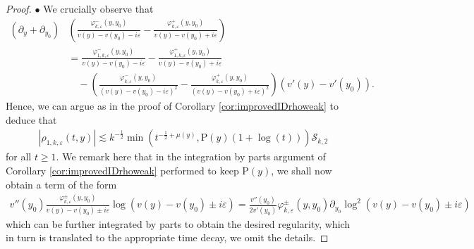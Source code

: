 \documentclass[11pt,reqno]{amsproc}
\newcommand{\bullpar}[1]{\vspace{.5em}\noindent $\bullet$ \normalfont {\bfseries #1.}}
\theoremstyle{definition}
\numberwithin{equation}{section}
\newcommand{\cS}{{\mathcal S}}
\newcommand{\ep}{\varepsilon}
\begin{document}
\begin{proof}
\bullpar{Estimates for $\rho_{1,k,\ep}(t,y)$} We crucially observe that
\begin{align*}
\left( \partial_y + \partial_{y_0} \right) &\left( \frac{\varphi_{k,\ep}^-(y,y_0)}{v(y) - v(y_0) - i\ep} - \frac{\varphi_{k,\ep}^+(y,y_0)}{v(y) - v(y_0) + i\ep} \right) \\
&= \frac{\varphi_{1,k,\ep}^-(y,y_0)}{v(y) - v(y_0) - i\ep} - \frac{\varphi_{1,k,\ep}^+(y,y_0)}{v(y) - v(y_0) + i\ep}  \\
&\quad - \left( \frac{\varphi_{k,\ep}^-(y,y_0)}{(v(y) - v(y_0) - i\ep)^2} - \frac{\varphi_{k,\ep}^+(y,y_0)}{(v(y) - v(y_0) + i\ep)^2} \right)(v'(y) - v'(y_0)).
\end{align*}
Hence, we can argue as in the proof of Corollary \ref{cor:improvedIDrhoweak} to deduce that
\begin{align*}
\left| \rho_{1,k,\ep}(t,y) \right| \lesssim k^{-\frac12}\min (t^{-\frac12+\mu(y)}, \mathrm{P}(y)(1+\log(t)))\cS_{k,2}
\end{align*}
for all $t\geq 1$. We remark here that in the integration by parts argument of Corollary \ref{cor:improvedIDrhoweak} performed to keep $\mathrm{P}(y)$, we shall now obtain a term of the form
\begin{align*}
v''(y_0)\frac{\varphi_{k,\ep}^\pm(y,y_0)}{v(y) - v(y_0) \pm i\ep}\log(v(y) - v(y_0) \pm i\ep) = \frac{v''(y_0)}{2v'(y_0)}\varphi_{k,\ep}^\pm(y,y_0) \partial_{y_0} \log^2 (v(y) - v(y_0) \pm i\ep)
\end{align*}
which can be further integrated by parts to obtain the desired regularity, which in turn is translated to the appropriate time decay, we omit the details.


\end{proof}
\end{document}

